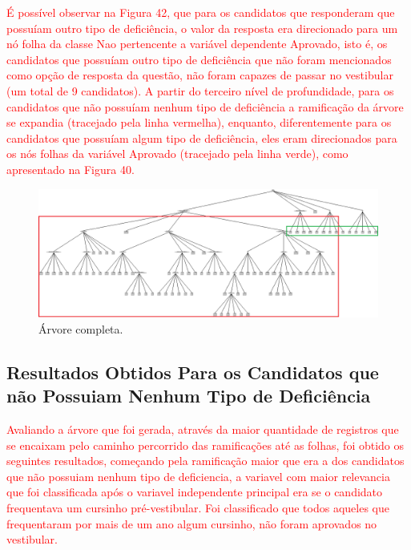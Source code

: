 \par
\textcolor{red}{É possível observar na Figura 42, que para os candidatos que responderam que possuíam outro tipo de deficiência, o valor da resposta era direcionado para um nó folha da classe Nao pertencente a variável dependente Aprovado, isto é, os candidatos que possuíam outro tipo de deficiência que não foram mencionados como opção de resposta da questão, não foram capazes de passar no vestibular (um total de 9 candidatos). A partir do terceiro nível de profundidade, para os candidatos que não possuíam nenhum tipo de deficiência a ramificação da árvore se expandia (tracejado pela linha vermelha), enquanto, diferentemente para os candidatos que possuíam algum tipo de deficiência, eles eram direcionados para os nós folhas da variável Aprovado (tracejado pela linha verde), como apresentado na Figura 40.}

\par
\begin{figure}[!htp]
	\begin{center}
    \caption{\label{fig:waveform_fig} Árvore completa.}
	\includegraphics[scale=0.45]{Figuras/Arvore_completa.png}
	\end{center}
\end{figure}


\subsection{Resultados Obtidos Para os Candidatos que não Possuiam Nenhum Tipo de Deficiência}


\par
\textcolor{red}{Avaliando a árvore que foi gerada, através da maior quantidade de registros que se encaixam pelo caminho percorrido das ramificações até as folhas, foi obtido os seguintes resultados, começando pela ramificação maior que era a dos candidatos que não possuiam nenhum tipo de deficiencia, a variavel com maior relevancia que foi classificada após o variavel independente principal era se o candidato frequentava um cursinho pré-vestibular. Foi classificado que todos aqueles que frequentaram por mais de um ano algum cursinho, não foram aprovados no vestibular.}

